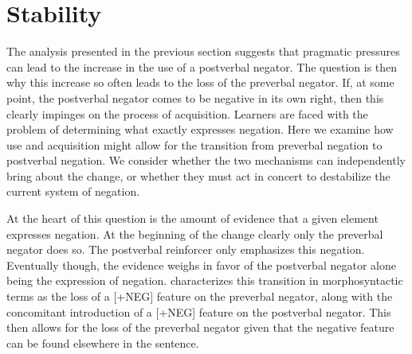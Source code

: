 \documentclass[12pt]{article}
\theoremstyle{definition} \newtheorem{definition}{Definition}
\begin{document}






\section{Stability}
\label{Stability}


The analysis presented in the previous section suggests that pragmatic pressures can lead to the increase in the use of a postverbal negator. The question is then why this increase so often leads to the loss of the preverbal negator. If, at some point, the postverbal negator comes to be negative in its own right, then this clearly impinges on the process of acquisition. Learners are faced with the problem of determining what exactly expresses negation. Here we examine how use and acquisition might allow for the transition from preverbal negation to postverbal negation. We consider whether the two mechanisms can independently bring about the change, or whether they must act in concert to destabilize the current system of negation.

At the heart of this question is the amount of evidence that a given element expresses negation. At the beginning of the change clearly only the preverbal negator does so. The postverbal reinforcer only emphasizes this negation. Eventually though, the evidence weighs in favor of the postverbal negator alone being the expression of negation. \cite{wallage2008} characterizes this transition in morphosyntactic terms as the loss of a [+NEG] feature on the preverbal negator, along with the concomitant introduction of a [+NEG] feature on the postverbal negator. This then allows for the loss of the preverbal negator given that the negative feature can be found elsewhere in the sentence.
\end{document}
